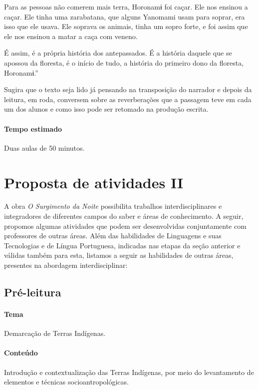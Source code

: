 \documentclass[12pt]{extarticle}
\begin{document}
Para as pessoas não comerem mais terra, Horonamɨ foi caçar. Ele nos ensinou a caçar. Ele tinha uma 
zarabatana, que alguns Yanomami usam para soprar, era isso que ele usava. Ele soprava os animais, tinha 
um sopro forte, e foi assim que ele nos ensinou a matar a caça com veneno.

É assim, é a própria história dos antepassados. É a história daquele que se apossou da floresta, é o 
início de tudo, a história do primeiro dono da floresta, Horonamɨ.''

Sugira que o texto seja lido já pensando na transposição do narrador e depois da leitura, em roda,
conversem sobre as reverberações que a passagem teve em cada um dos alunos e como isso pode ser
retomado na produção escrita.


\paragraph{Tempo estimado} Duas aulas de 50 minutos.


\section{Proposta de atividades II}


A obra \emph{O Surgimento da Noite} possibilita trabalhos
interdisciplinares e integradores de diferentes campos do saber e áreas
de conhecimento. A seguir, propomos algumas atividades que podem ser
desenvolvidas conjuntamente com professores de outras áreas. Além das
habilidades de Linguagens e suas Tecnologias e de Língua Portuguesa,
indicadas nas etapas da seção anterior e válidas também para esta,
listamos a seguir as habilidades de outras áreas, presentes na abordagem
interdisciplinar:



\subsection{Pré-leitura}

\paragraph{Tema} Demarcação de Terras Indígenas.

\paragraph{Conteúdo} Introdução e contextualização das Terras Indígenas, por meio
do levantamento de elementos e técnicas socioantropológicas.
\end{document}
